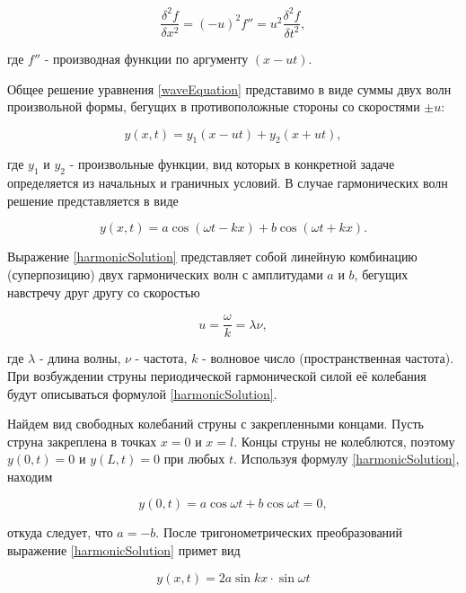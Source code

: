 \documentclass[a4paper,12pt]{article} %
\begin{document}
\begin{equation}
    \frac{\delta^2 f}{\delta x^2} = (-u)^2 f'' = u^2 \frac{\delta^2 f}{\delta t^2},
\end{equation}

где $ f'' $ - производная функции по аргументу $ (x - ut) $.

Общее решение уравнения \eqref{waveEquation} представимо в виде суммы двух волн произвольной формы, бегущих в противоположные стороны со скоростями $ \pm u $:

\begin{equation}
    y(x, t) = y_1(x - ut) + y_2(x + ut),
\end{equation}

где $ y_1 $ и $ y_2 $ - произвольные функции, вид которых
в конкретной задаче определяется из начальных и граничных условий. В случае гармонических волн решение представляется в виде

\begin{equation}
    y(x, t) = a\cos{(\omega t - kx)} + b\cos{(\omega t + kx)}.
    \label{harmonicSolution}
\end{equation}

Выражение \eqref{harmonicSolution} представляет собой линейную комбинацию (суперпозицию)
двух гармонических волн с амплитудами $ a $ и $ b $, бегущих навстречу друг
другу со скоростью

\begin{equation}
    u = \frac{\omega}{k} = \lambda \nu ,
\end{equation}

где $ \lambda $ - длина волны, $ \nu $ - частота, $ k $ - волновое число (пространственная частота). При возбуждении струны периодической гармонической силой её колебания будут описываться формулой \eqref{harmonicSolution}.

Найдем вид свободных колебаний струны с закрепленными концами.
Пусть струна закреплена в точках $ x = 0 $ и $ x = l $. Концы струны не колеблются, поэтому $ y(0, t) = 0 $ и $ y(L, t) = 0$ при любых $ t $. Используя формулу \eqref{harmonicSolution}, находим

\begin{equation}
    y(0, t) = a\cos{\omega t} + b\cos{\omega t} = 0,
\end{equation}

откуда следует, что $ a = -b $. После тригонометрических преобразований выражение \eqref{harmonicSolution} примет вид

\begin{equation}
    y(x, t) = 2a\sin{kx} \cdot \sin{\omega t}
    \label{staticWaves}
\end{equation}
\end{document}
